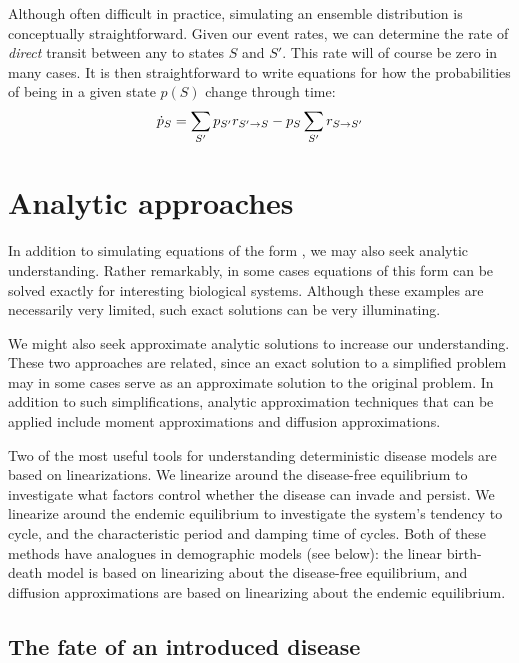 \documentclass{amsproc}
\theoremstyle{definition}
\theoremstyle{remark}
\numberwithin{equation}{section}
\begin{document}
Although often difficult in practice, simulating an ensemble distribution is conceptually straightforward.  
Given our event rates, we can determine the rate of {\em direct} transit between any to states $S$ and $S'$.  
This rate will of course be zero in many cases.
It is then straightforward to write equations for how the probabilities of being in a given state $p(S)$ change through time:
\begin{equation}
	\dot p_S =
	\sum_{S'}{p_{S'} r_{S'\to S}} -  p_S \sum_{S'}{r_{S\to S'}}  
	\eqlab{distribution}
\end{equation}

\section{Analytic approaches}

In addition to simulating equations of the form , we may also seek analytic understanding.
Rather remarkably, in some cases equations of this form can be solved exactly for interesting biological systems.
Although these examples are necessarily very limited, such exact solutions can be very illuminating.

We might also seek approximate analytic solutions to increase our understanding.   
These two approaches are related, since an exact solution to a simplified problem may in some cases serve as an approximate solution to the original problem.  
In addition to such simplifications, analytic approximation techniques that can be applied include moment approximations and diffusion approximations.

Two of the most useful tools for understanding deterministic disease models are based on linearizations.  
We linearize around the disease-free equilibrium to investigate what factors control whether the disease can invade and persist. 
We linearize around the endemic equilibrium to investigate the system's tendency to cycle, and the characteristic period and damping time of cycles.  
Both of these methods have analogues in demographic models (see below): the linear birth-death model is based on linearizing about the disease-free equilibrium, and diffusion approximations are based on linearizing about the endemic equilibrium.

\subsection{The fate of an introduced disease}
\end{document}
